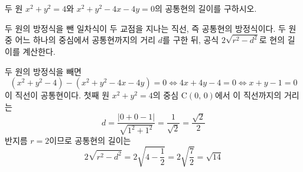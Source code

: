 \documentclass[10pt]{article}
\begin{document}
\dmchecktitle



\newpage


\begin{dmproblem}
두 원 $x^2 + y^2 = 4$와 $x^2 + y^2 - 4x - 4y = 0$의 공통현의 길이를 구하시오.
\end{dmproblem}

\begin{dmapproach}
두 원의 방정식을 뺀 일차식이 두 교점을 지나는 직선, 즉 공통현의 방정식이다. 두 원 중 어느 하나의 중심에서 공통현까지의 거리 $d$를 구한 뒤, 공식 $2\sqrt{r^2 - d^2}$로 현의 길이를 계산한다.
\end{dmapproach}

\begin{dmsolution}
두 원의 방정식을 빼면
\begin{equation*}
  (x^2 + y^2 - 4) - (x^2 + y^2 - 4x - 4y) = 0 \iff 4x + 4y - 4 = 0 \iff x + y - 1 = 0
\end{equation*}
이 직선이 공통현이다. 첫째 원 $x^2 + y^2 = 4$의 중심 $\mathrm{C}(0,\, 0)$에서 이 직선까지의 거리는
\begin{equation*}
  d = \frac{|0 + 0 - 1|}{\sqrt{1^2 + 1^2}} = \frac{1}{\sqrt{2}} = \frac{\sqrt{2}}{2}
\end{equation*}
반지름 $r = 2$이므로 공통현의 길이는
\begin{equation*}
  2\sqrt{r^2 - d^2} = 2\sqrt{4 - \frac{1}{2}} = 2\sqrt{\frac{7}{2}} = \sqrt{14}
\end{equation*}
\end{dmsolution}

\dmchecktitle

\end{document}

